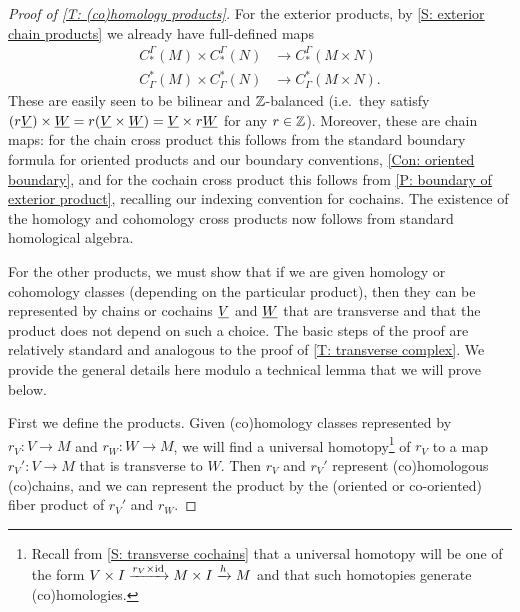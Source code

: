 \begin{proof}[Proof of \cref{T: (co)homology products}]
For the exterior products, by \cref{S: exterior chain products} we already have full-defined maps
\begin{align*}C^\Gamma_*(M) \times C^\Gamma_*(N)& \to C^\Gamma_*(M \times N)\\ C_\Gamma^*(M) \times C_\Gamma^*(N)& \to C_\Gamma^*(M \times N).
\end{align*}
These are easily seen to be bilinear and $\mathbb{Z}$-balanced (i.e.\ they satisfy $(r\underline{V}) \times \underline{W} = r(\underline{V} \times \underline{W}) = \underline{V} \times r\underline{W}$ for any $r \in \mathbb{Z}$). Moreover, these are chain maps: for the chain cross product this follows from the standard boundary formula for oriented products and our boundary conventions, \cref{Con: oriented boundary}, and for the cochain cross product this follows from \cref{P: boundary of exterior product}, recalling our indexing convention for cochains. The existence of the homology and cohomology cross products now follows from standard homological algebra.

For the other products, we must show that if we are given homology or cohomology classes (depending on the particular product), then they can be represented by chains or cochains $\underline{V}$ and $\underline{W}$ that are transverse and that the product does not depend on such a choice.
The basic steps of the proof are relatively standard and analogous to the proof of \cref{T: transverse complex}. We provide the general details here modulo a technical lemma that we will prove below.

First we define the products. Given (co)homology classes represented by $r_V \colon V \to M$ and $r_W \colon W \to M$, we will find a universal homotopy\footnote{Recall from \cref{S: transverse cochains} that a universal homotopy will be one of the form $V \times I \xrightarrow{r_V \times \mathrm{id}} M \times I \xrightarrow{h} M$ and that such homotopies generate (co)homologies.} of $r_V$ to a map $r_V' \colon V \to M$ that is transverse to $W$. Then $r_V$ and $r_V'$ represent (co)homologous (co)chains, and we can represent the product by the (oriented or co-oriented) fiber product of $r_V'$ and $r_W$.


\end{proof}
